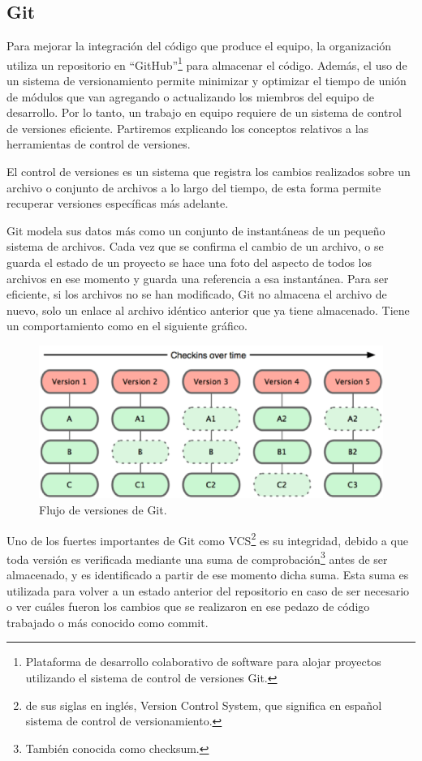 \subsection{Git}
Para mejorar la integración del código que produce el equipo, la organización utiliza un repositorio en \enquote{GitHub}\footnote{Plataforma de desarrollo colaborativo de software para alojar proyectos utilizando el sistema de control de versiones Git.} para almacenar el código. Además, el uso de un sistema de versionamiento permite minimizar y optimizar el tiempo de unión de módulos que van agregando o actualizando los miembros del equipo de desarrollo. Por lo tanto, un trabajo en equipo requiere de un sistema de control de versiones eficiente. Partiremos explicando los conceptos relativos a las herramientas de control de versiones.

El control de versiones es un sistema que registra los cambios realizados sobre un archivo o conjunto de archivos a lo largo del tiempo, de esta forma permite recuperar versiones específicas más adelante\citep{chacon2014pro}.

Git modela sus datos más como un conjunto de instantáneas de un pequeño sistema de archivos. Cada vez que se confirma el cambio de un archivo, o se guarda el estado de un proyecto se hace una foto del aspecto de todos los archivos en ese momento y guarda una referencia a esa instantánea. Para ser eficiente, si los archivos no se han modificado, Git no almacena el archivo de nuevo, solo un enlace al archivo idéntico anterior que ya tiene almacenado. Tiene un comportamiento como en el siguiente gráfico. 

\begin{figure}[H]
\centering
\includegraphics[width=125mm,scale=1]{Figuras/tecnologias/git_over_time}
\caption{Flujo de versiones de Git.}
  \label{graph_git}
\end{figure}

Uno de los fuertes importantes de Git como VCS\footnote{de sus siglas en inglés, Version Control System, que significa en español sistema de control de versionamiento.} es su integridad, debido a que toda versión es verificada mediante una suma de comprobación\footnote{También conocida como checksum.} antes de ser almacenado, y es identificado a partir de ese momento dicha suma. Esta suma es utilizada para volver a un estado anterior del repositorio en caso de ser necesario o ver cuáles fueron los cambios que se realizaron en ese pedazo de código trabajado o más conocido como commit.

